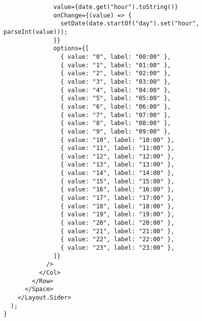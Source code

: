 \begin{verbatim}
              value={date.get("hour").toString()}
              onChange={(value) => {
                setDate(date.startOf("day").set("hour", parseInt(value)));
              }}
              options={[
                { value: "0", label: "00:00" },
                { value: "1", label: "01:00" },
                { value: "2", label: "02:00" },
                { value: "3", label: "03:00" },
                { value: "4", label: "04:00" },
                { value: "5", label: "05:00" },
                { value: "6", label: "06:00" },
                { value: "7", label: "07:00" },
                { value: "8", label: "08:00" },
                { value: "9", label: "09:00" },
                { value: "10", label: "10:00" },
                { value: "11", label: "11:00" },
                { value: "12", label: "12:00" },
                { value: "13", label: "13:00" },
                { value: "14", label: "14:00" },
                { value: "15", label: "15:00" },
                { value: "16", label: "16:00" },
                { value: "17", label: "17:00" },
                { value: "18", label: "18:00" },
                { value: "19", label: "19:00" },
                { value: "20", label: "20:00" },
                { value: "21", label: "21:00" },
                { value: "22", label: "22:00" },
                { value: "23", label: "23:00" },
              ]}
            />
          </Col>
        </Row>
      </Space>
    </Layout.Sider>
  );
}

\end{verbatim}
